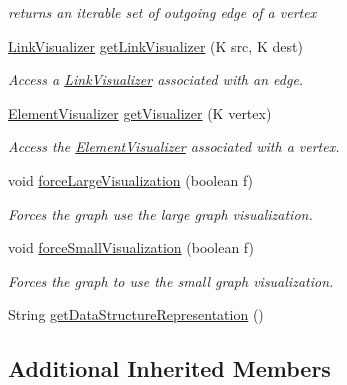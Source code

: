 \begin{DoxyCompactItemize}
\begin{DoxyCompactList}\small\item\em returns an iterable set of outgoing edge of a vertex \end{DoxyCompactList}\item 
\hyperlink{classbridges_1_1base_1_1_link_visualizer}{Link\+Visualizer} \hyperlink{classbridges_1_1base_1_1_graph_adj_list_af93888dbd2a768a2401619ad5dc95560}{get\+Link\+Visualizer} (K src, K dest)
\begin{DoxyCompactList}\small\item\em Access a \hyperlink{classbridges_1_1base_1_1_link_visualizer}{Link\+Visualizer} associated with an edge. \end{DoxyCompactList}\item 
\hyperlink{classbridges_1_1base_1_1_element_visualizer}{Element\+Visualizer} \hyperlink{classbridges_1_1base_1_1_graph_adj_list_aafb45833cd5c13b6ce9bdece3fefde6a}{get\+Visualizer} (K vertex)
\begin{DoxyCompactList}\small\item\em Access the \hyperlink{classbridges_1_1base_1_1_element_visualizer}{Element\+Visualizer} associated with a vertex. \end{DoxyCompactList}\item 
void \hyperlink{classbridges_1_1base_1_1_graph_adj_list_a0e2dff032458bb03cb778b571ddcc9b6}{force\+Large\+Visualization} (boolean f)
\begin{DoxyCompactList}\small\item\em Forces the graph use the large graph visualization. \end{DoxyCompactList}\item 
void \hyperlink{classbridges_1_1base_1_1_graph_adj_list_ae14e51214742db0c4dab26c1d409f4ed}{force\+Small\+Visualization} (boolean f)
\begin{DoxyCompactList}\small\item\em Forces the graph to use the small graph visualization. \end{DoxyCompactList}\item 
String \hyperlink{classbridges_1_1base_1_1_graph_adj_list_a9bba66056cdf24197c41fff455e19a6c}{get\+Data\+Structure\+Representation} ()
\end{DoxyCompactItemize}
\subsection*{Additional Inherited Members}


